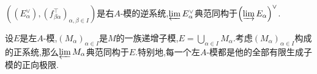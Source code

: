 \begin{corollary}{}{}
	$\left(\left(E_{\alpha}^{\vee}\right),\left(f_{\beta\alpha}^{\top}\right)_{\alpha,\beta\in I}\right)$是右$A$-模的逆系统,$\varprojlim E_{\alpha}^{\vee}$典范同构于$\left(\varinjlim E_{\alpha}\right)^{\vee}$.
\end{corollary}

\begin{remark}{}{}
	设$E$是左$A$-模,$\left(M_{\alpha}\right)_{\alpha\in I}$是$M$的一族递增子模,$E=\bigcup\limits_{\alpha\in I}M_{\alpha}$.考虑$\left(M_{\alpha}\right)_{\alpha\in I}$构成的正系统,那么$\varprojlim M_{\alpha}$典范同构于$E$.特别地,每一个左$A$-模都是他的全部有限生成子模的正向极限.
\end{remark}

















































































